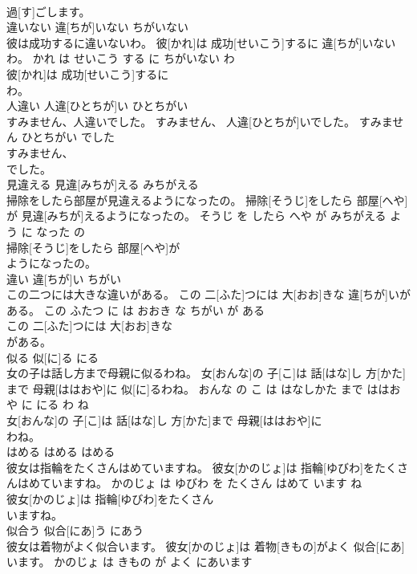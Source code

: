 \documentclass[8pt]{extreport}
\begin{document}
\begin{CJK}{UTF8}{min}
\\	過[す]ごします。			
\\	違いない	違[ちが]いない	ちがいない	
\\	彼は成功するに違いないわ。	彼[かれ]は 成功[せいこう]するに 違[ちが]いないわ。	かれ は せいこう する に ちがいない わ	
\\	彼[かれ]は 成功[せいこう]するに
\\	わ。			
\\	人違い	人違[ひとちが]い	ひとちがい	
\\	すみません、人違いでした。	すみません、 人違[ひとちが]いでした。	すみません ひとちがい でした	
\\	すみません、
\\	でした。			
\\	見違える	見違[みちが]える	みちがえる	
\\	掃除をしたら部屋が見違えるようになったの。	掃除[そうじ]をしたら 部屋[へや]が 見違[みちが]えるようになったの。	そうじ を したら へや が みちがえる よう に なった の	
\\	掃除[そうじ]をしたら 部屋[へや]が
\\	ようになったの。			
\\	違い	違[ちが]い	ちがい	
\\	この二つには大きな違いがある。	この 二[ふた]つには 大[おお]きな 違[ちが]いがある。	この ふたつ に は おおき な ちがい が ある	
\\	この 二[ふた]つには 大[おお]きな
\\	がある。			
\\	似る	似[に]る	にる	
\\	女の子は話し方まで母親に似るわね。	女[おんな]の 子[こ]は 話[はな]し 方[かた]まで 母親[ははおや]に 似[に]るわね。	おんな の こ は はなしかた まで ははおや に にる わ ね	
\\	女[おんな]の 子[こ]は 話[はな]し 方[かた]まで 母親[ははおや]に
\\	わね。			
\\	はめる	はめる	はめる	
\\	彼女は指輪をたくさんはめていますね。	彼女[かのじょ]は 指輪[ゆびわ]をたくさんはめていますね。	かのじょ は ゆびわ を たくさん はめて います ね	
\\	彼女[かのじょ]は 指輪[ゆびわ]をたくさん
\\	いますね。			
\\	似合う	似合[にあ]う	にあう	
\\	彼女は着物がよく似合います。	彼女[かのじょ]は 着物[きもの]がよく 似合[にあ]います。	かのじょ は きもの が よく にあいます	

\end{CJK}
\end{document}

